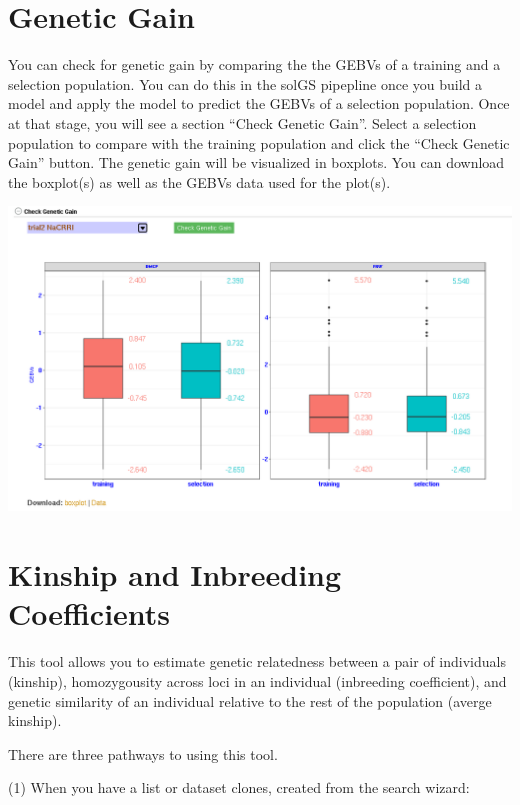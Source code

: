 \documentclass[
  12pt,
]{book}
\begin{document}
\hypertarget{genetic-gain}{%
\section{Genetic Gain}\label{genetic-gain}}

You can check for genetic gain by comparing the the GEBVs of a training and a selection population. You can do this in the solGS pipepline once you build a model and apply the model to predict the GEBVs of a selection population. Once at that stage, you will see a section ``Check Genetic Gain''. Select a selection population to compare with the training population and click the ``Check Genetic Gain'' button. The genetic gain will be visualized in boxplots. You can download the boxplot(s) as well as the GEBVs data used for the plot(s).

\begin{center}\includegraphics[width=0.95\linewidth]{assets/images/genetic-gain} \end{center}

\hypertarget{kinship-and-inbreeding-coefficients}{%
\section{Kinship and Inbreeding Coefficients}\label{kinship-and-inbreeding-coefficients}}

This tool allows you to estimate genetic relatedness between a pair of individuals (kinship), homozygousity across loci in an individual (inbreeding coefficient), and genetic similarity of an individual relative to the rest of the population (averge kinship).

There are three pathways to using this tool.

(1) When you have a list or dataset clones, created from the search wizard:
\end{document}
